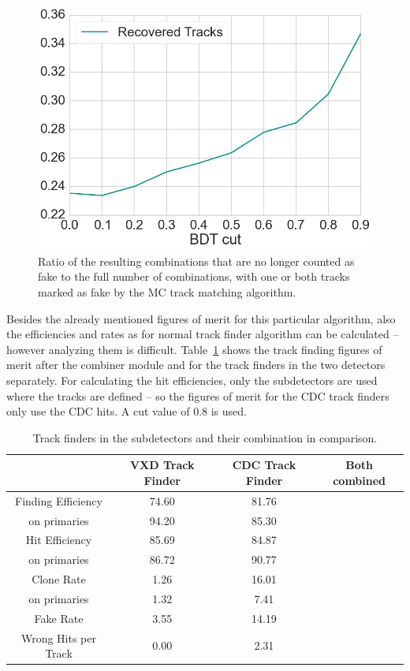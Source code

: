 \begin{figure}
  \centering
  \includegraphics[width=0.7\linewidth]{figures/workflow/vxd_cdc_merger_recovered.png}
  \caption{Ratio of the resulting combinations that are no longer counted as fake to the full number of combinations, with one or both tracks marked as fake by the MC track matching algorithm.}
  \label{fig-vxd-cdc-recovered}
\end{figure}

Besides the already mentioned figures of merit for this particular algorithm, also the efficiencies and rates as for normal track finder algorithm can be calculated -- however analyzing them is difficult. Table~\ref{tab-vxd-cdc-fom} shows the track finding figures of merit after the combiner module and for the track finders in the two detectors separately. For calculating the hit efficiencies, only the subdetectors are used where the tracks are defined -- so the figures of merit for the CDC track finders only use the CDC hits. A cut value of 0.8 is used.


\begin{table}
  \centering
  \caption{Track finders in the subdetectors and their combination in comparison.}
  \label{tab-vxd-cdc-fom}
  \begin{tabular}{cccc} \toprule
    & VXD Track Finder & CDC Track Finder & Both combined \\ \midrule
    Finding Efficiency   & 74.60 & 81.76 &  \\
    \quad on primaries   & 94.20 & 85.30 &  \\ 
    Hit Efficiency       & 85.69 & 84.87 &  \\
    \quad on primaries   & 86.72 & 90.77 &  \\ 
    Clone Rate           & 1.26 & 16.01 &  \\
    \quad on primaries   & 1.32 & 7.41 &  \\ 
    Fake Rate            & 3.55 & 14.19 &  \\ 
    Wrong Hits per Track & 0.00 & 2.31 &  \\ \bottomrule
  \end{tabular}
\end{table}


